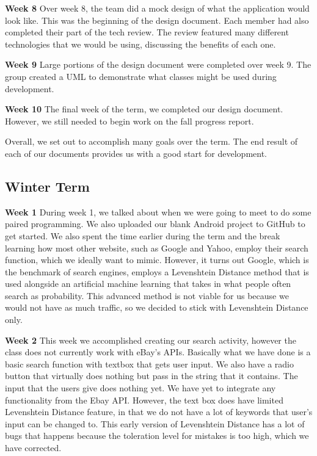 \documentclass[journal,compsoc, 10pt, draftclsnofoot, onecolumn]{IEEEtran}
\begin{document}
\textbf{Week 8}\newline
Over week 8, the team did a mock design of what the application would look like. 
This was the beginning of the design document. Each member had also completed 
their part of the tech review. The review featured many different technologies that 
we would be using, discussing the benefits of each one. \newline

\textbf{Week 9}\newline
Large portions of the design document were completed over week 9. The group 
created a UML to demonstrate what classes might be used during development. 
\newline

\textbf{Week 10}\newline
The final week of the term, we completed our design document. However, we still 
needed to begin work on the fall progress report. \newline

Overall, we set out to accomplish many goals over the term. The end result of 
each of our documents provides us with a good start for development. 

\subsection{Winter Term}
\textbf{Week 1}\newline
During week 1, we talked about when we were going to meet to do some paired 
programming. We also uploaded our blank Android project to GitHub to get 
started. We also spent the time earlier during the term and the break learning how most other website, such as Google and Yahoo, employ their search function, which we ideally want to mimic. However, it turns out Google, which is the benchmark of search engines, employs a Levenshtein Distance method that is used alongside an artificial machine learning that takes in what people often search as probability. This advanced method is not viable for us because we would not have as much traffic, so we decided to stick with Levenshtein Distance only. \newline

\textbf{Week 2}\newline
This week we accomplished creating our search activity, however the class does 
not currently work with eBay's APIs. Basically what we have done is a basic search function with textbox that gets user input. We also have a radio button that virtually does nothing but pass in the string that it contains. The input that the users give does nothing yet. We have yet to integrate any functionality from the Ebay API. However, the text box does have limited Levenshtein Distance feature, in that we do not have a lot of keywords that user’s input can be changed to. This early version of Levenshtein Distance has a lot of bugs that happens because the toleration level for mistakes is too high, which we have corrected.  \newline
\end{document}
